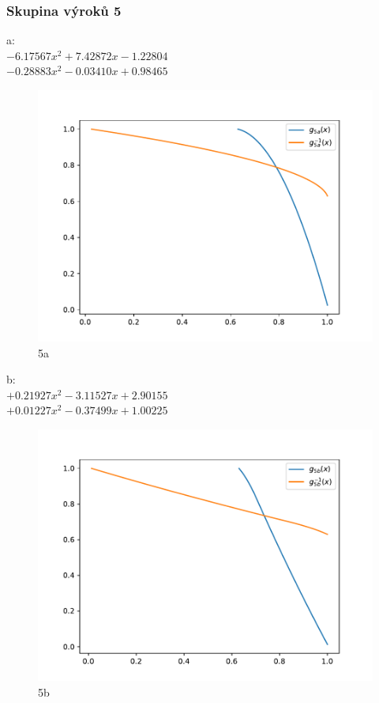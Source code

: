 \subsubsection{Skupina výrok\r u 5}
a:\\
$-6.17567x^2+7.42872x-1.22804$\\
$-0.28883x^2-0.03410x+0.98465$\\
\begin{figure}[H]
    \caption{5a}
        \hspace{-1cm}
        \includegraphics[scale=0.5]{template-fig/p8.pdf}
        \centering
\end{figure}
b:\\
$+0.21927x^2-3.11527x+2.90155$\\
$+0.01227x^2-0.37499x+1.00225$\\
\begin{figure}[H]
    \caption{5b}
        \hspace{-1cm}
        \includegraphics[scale=0.5]{template-fig/p9.pdf}
        \centering
\end{figure}

